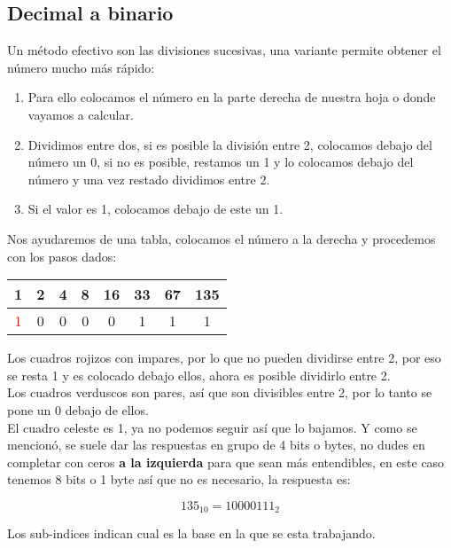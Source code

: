 \documentclass[
	12pt, %
	fleqn, %
	a4paper, %
	oneside, %
]{LegrandOrangeBook}
\begin{document}
\subsection{Decimal a binario}
Un método efectivo son las divisiones sucesivas, una variante permite obtener el número mucho más rápido:
\begin{enumerate}
\item Para ello colocamos el número en la parte derecha de nuestra hoja o donde vayamos a calcular.
\item Dividimos entre dos, si es posible la división entre 2, colocamos debajo del número un 0, si no es posible, restamos un 1 y lo colocamos debajo del número y una vez restado dividimos entre 2.
\item Si el valor es 1, colocamos debajo de este un 1.
\end{enumerate}
\begin{example}
Nos ayudaremos de una tabla, colocamos el número a la derecha y procedemos con los pasos dados:
\begin{center}
\begin{tabular}{|c|c|c|c|c|c|c|c|}
\hline
\rowcolor[HTML]{9AFF99} 
\cellcolor[HTML]{96FFFB}1 & 2 & 4 & 8 & 16 & \cellcolor[HTML]{FFCCC9}33 & \cellcolor[HTML]{FFCCC9}67 & \cellcolor[HTML]{FFCCC9}135 \\ \hline
\textcolor{red}{1}        & 0 & 0 & 0 & 0  & 1                          & 1                          & 1                           \\ \hline
\end{tabular}
\end{center}
Los cuadros rojizos con impares, por lo que no pueden dividirse entre 2, por eso se resta 1 y es colocado debajo ellos, ahora es posible dividirlo entre 2.\\
Los cuadros verduscos son pares, así que son divisibles entre 2, por lo tanto se pone un 0 debajo de ellos.\\
El cuadro celeste es 1, ya no podemos seguir así que lo bajamos. Y como se mencionó, se suele dar las respuestas en grupo de 4 bits o bytes, no dudes en completar con ceros \textbf{a la izquierda} para que sean más entendibles, en este caso tenemos 8 bits o 1 byte así que no es necesario, la respuesta es:
\begin{center}
\begin{displaymath}
135_{10}=1000 0111_2
\end{displaymath}
\end{center}
\end{example}
\begin{remark}
Los sub-indices indican cual es la base en la que se esta trabajando.
\end{remark}
\end{document}
